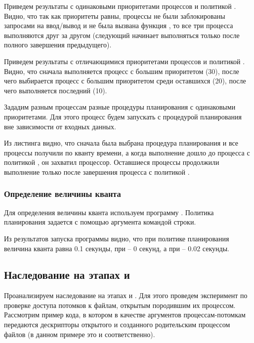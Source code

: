 Приведем результаты с одинаковыми приоритетами процессов и политикой . Видно, что так как приоритеты равны, процессы не были заблокированы запросами на ввод/вывод и не была вызвана функция , то все три процесса выполняются друг за другом (следующий начинает выполняться только после полного завершения предыдущего).


Приведем результаты с отличающимися приоритетами процессов и политикой . Видно, что сначала выполняется процесс с большим приоритетом (30), после чего выбирается процесс с большим приоритетом среди оставшихся (20), после чего выполняется последний (10).


Зададим разным процессам разные процедуры планирования с одинаковыми приоритетами. Для этого процесс  будем запускать с процедурой планирования  вне зависимости от входных данных.

Из листинга видно, что сначала была выбрана процедура планирования  и все процессы получили по кванту времени, а когда выполнение дошло до процесса с политикой , он захватил процессор. Оставшиеся процессы продолжили выполнение только после завершения процесса с политикой .

\subsubsection{Определение величины кванта}

Для определения величины кванта используем программу . Политика планирования задается с помощью аргумента командой строки.



Из результатов запуска программы видно, что при политике планирования  величина кванта равна 0.1 секунды, при  -- 0 секунд, а при  -- 0.02 секунды.



\subsection{Наследование на этапах  и }

Проанализируем наследование на этапах  и . Для этого проведем эксперимент по проверке доступа потомков к файлам, открытым породившим их процессом. Рассмотрим пример кода, в котором в качестве аргументов процессам-потомкам передаются дескрипторы открытого и созданного родительским процессом файлов (в данном примере это  и  соответственно).

